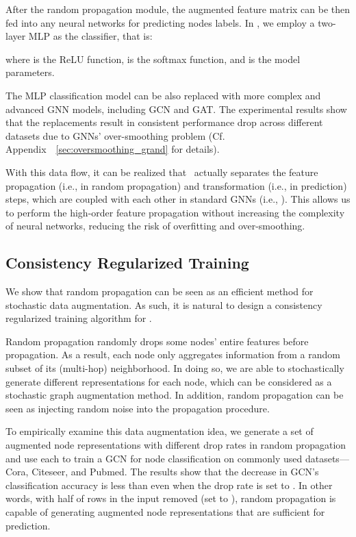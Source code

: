 {
After the random propagation module, the augmented feature matrix  can be then fed into any neural networks for predicting nodes labels. 
In \model, we employ a two-layer MLP as the classifier, that is:

where  is the ReLU function,  is the softmax function, and  is the model parameters. 


The MLP classification model can be also replaced with more complex and advanced GNN models, including GCN and GAT. 
The experimental results show that the replacements result in consistent performance drop across different datasets due to GNNs' over-smoothing problem (Cf. Appendix~~\ref{sec:oversmoothing_grand} for details). 


With this data flow, it can be realized that \model\ actually separates the feature propagation (i.e.,  in random propagation) and transformation (i.e.,  in prediction) steps, which are coupled with each other in standard GNNs (i.e., ). 
This allows us to perform the high-order feature propagation  without increasing the complexity of neural networks, reducing the risk of overfitting and over-smoothing. 







\subsection{Consistency Regularized Training}
We show that random propagation can be seen as an efficient method for stochastic data augmentation. 
As such, it is natural to design a consistency regularized training algorithm for \model. 
  
  

Random propagation randomly drops some nodes' entire features before propagation. 
As a result, each node only aggregates information from a random subset of its (multi-hop) neighborhood. 
In doing so, we are able to stochastically generate different representations for each node, which can be considered as a stochastic graph augmentation method. 
In addition, random propagation can be seen as injecting random noise into the propagation procedure. 


To empirically examine this data augmentation idea, we generate a set of augmented node representations  with different drop rates in random propagation and use each  to train a GCN for node classification on commonly used datasets---Cora, Citeseer, and Pubmed.  The results show that the decrease in GCN's classification accuracy is less than  even when the drop rate is set to . 
In other words, with half of rows in the input  removed (set to ), random propagation is capable of generating augmented node representations that are sufficient for prediction. 


}

